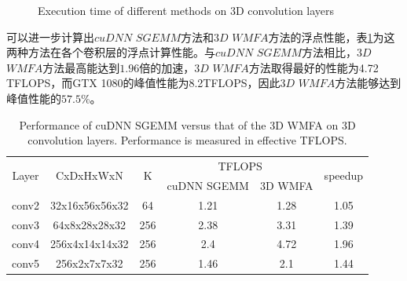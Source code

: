 \begin{figure}[tbh]%
\centering
{}
\caption{Execution time of different methods on 3D convolution layers}
\label{result3}
\end{figure}


可以进一步计算出$cuDNN$ $SGEMM$方法和$3D$ $WMFA$方法的浮点性能，表\ref{FlopsInfo}为这两种方法在各个卷积层的浮点计算性能。与$cuDNN$ $SGEMM$方法相比，$3D$ $WMFA$方法最高能达到$1.96$倍的加速，$3D$ $WMFA$方法取得最好的性能为4.72 TFLOPS，而GTX 1080的峰值性能为8.2TFLOPS，因此$3D$ $WMFA$方法能够达到峰值性能的$57.5$\%。

\begin{table}[]
\centering
\caption{Performance of cuDNN SGEMM versus that of the 3D WMFA on 3D convolution layers. Performance is measured in effective TFLOPS.}
\label{FlopsInfo}
\begin{tabular}{|c|c|c|c|c|c|}
\hline
\multirow{2}{*}{Layer} & \multirow{2}{*}{CxDxHxWxN} & \multirow{2}{*}{K} & \multicolumn{2}{c|}{TFLOPS} & \multirow{2}{*}{speedup} \\ \cline{4-5}
                       &                            &                    & cuDNN SGEMM       & 3D WMFA        &                          \\ \hline
conv2                  & 32x16x56x56x32             & 64                 & 1.21        & 1.28          & 1.05                     \\ \hline
conv3                  & 64x8x28x28x32              & 256                & 2.38        & 3.31          & 1.39                     \\ \hline
conv4                  & 256x4x14x14x32             & 256                & 2.4         & 4.72          & 1.96                     \\ \hline
conv5                  & 256x2x7x7x32               & 256                & 1.46        & 2.1           & 1.44                     \\ \hline
\end{tabular}
\end{table}

